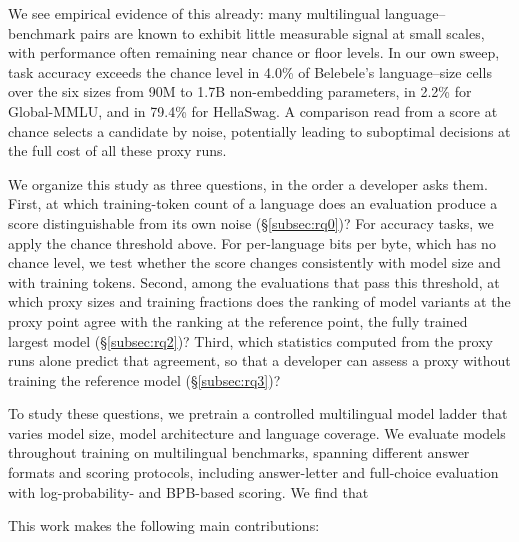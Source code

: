 We see empirical evidence of this already: many multilingual language--benchmark pairs are known to exhibit little measurable signal at small scales, with performance often remaining near chance or floor levels.
In our own sweep, task accuracy exceeds the chance level in 4.0\% of Belebele's language--size cells over the six sizes from 90M to 1.7B non-embedding parameters, in 2.2\% for Global-MMLU, and in 79.4\% for HellaSwag. A comparison read from a score at chance selects a candidate by noise, potentially leading to suboptimal decisions at the full cost of all these proxy runs.

We organize this study as three questions, in the order a developer asks them.
First, at which training-token count of a language does an evaluation produce a score distinguishable from its own noise (\S\ref{subsec:rq0})? For accuracy tasks, we apply the chance threshold above. For per-language bits per byte, which has no chance level, we test whether the score changes consistently with model size and with training tokens.
Second, among the evaluations that pass this threshold, at which proxy sizes and training fractions does the ranking of model variants at the proxy point agree with the ranking at the reference point, the fully trained largest model (\S\ref{subsec:rq2})?
Third, which statistics computed from the proxy runs alone predict that agreement, so that a developer can assess a proxy without training the reference model (\S\ref{subsec:rq3})?

To study these questions, we pretrain a controlled multilingual model ladder that varies model size, model architecture and language coverage.
We evaluate models throughout training on \nbenchmarks multilingual benchmarks, spanning different answer formats and scoring protocols, including answer-letter and full-choice evaluation with log-probability- and BPB-based scoring.
We find that  

This work makes the following main contributions:

